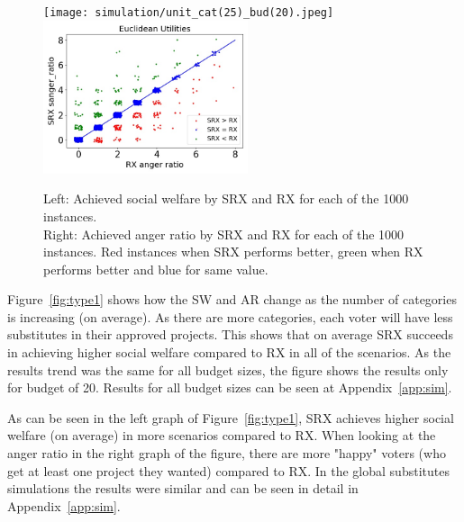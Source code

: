 \documentclass[runningheads]{llncs}
\newcommand{\kibitz}[2]{\ifnum\Comments=1{\color{#1}{#2}}\fi}
\newcommand{\rmr}[1]{\kibitz{red}{[Reshef says:#1]}}
\begin{document}
\begin{figure}[t]
\begin{center}
\texttt{[image: simulation/unit\_cat(25)\_bud(20).jpeg]}
\includegraphics[width=6cm]{simulation/ar_unit_cat(25)_bud(20).jpeg}
\caption{Left: Achieved social welfare by SRX and RX for each of the 1000 instances.\\
Right: Achieved anger ratio by SRX and RX for each of the 1000 instances. Red instances when SRX performs better, green when RX performs better and blue for same value. \rmr{maybe flip so that green is better?}
 }\label{fig:scatter}\vspace{-7.5mm}
\end{center}
\end{figure}




Figure~\ref{fig:type1} shows how the SW and AR change as the number of categories is increasing (on average). As there are more categories, each voter will have less substitutes in their approved projects. This shows that on average SRX succeeds in achieving higher social welfare compared to RX in all of the scenarios. As the results trend was the same for all budget sizes, the figure shows the results only for budget of 20. Results for all budget sizes can be seen at Appendix~\ref{app:sim}.

As can be seen in the left graph of Figure~\ref{fig:type1}, SRX  achieves higher social welfare (on average) in more scenarios compared to RX. When looking at the anger ratio in the right graph of the figure, there are more "happy" voters (who get at least one project they wanted) compared to RX. In the global substitutes simulations the results were similar and can be seen in detail in Appendix~\ref{app:sim}.

\end{document}
